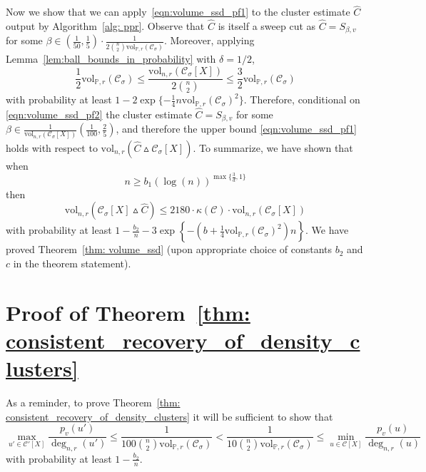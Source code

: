 \documentclass[11pt,twoside]{article}
\newcommand{\set}[1]{\left\{#1\right\}}
\newcommand{\vol}{\mathrm{vol}}
\newcommand{\1}{\mathbbm{1}}
\newcommand{\Xbf}{X}
\newcommand{\Pbb}{\mathbb{P}}
\newcommand{\Cset}{\mathcal{C}}
\newcommand{\Csig}{\Cset_{\sigma}}
\newcommand{\Cest}{\widehat{C}}
\begin{document}
Now we show that we can apply~\eqref{eqn:volume_ssd_pf1} to the cluster estimate $\Cest$ output by Algorithm~\ref{alg: ppr}. Observe that $\Cest$ is itself a sweep cut as $\Cest = S_{\beta,v}$ for some $\beta \in \left(\frac{1}{50},\frac{1}{5}\right)\cdot\frac{1}{2{n \choose 2}\vol_{\Pbb,r}(\Csig)}$. Moreover, applying  Lemma~\ref{lem:ball_bounds_in_probability} with $\delta = 1/2$,
\begin{equation}
\label{eqn:volume_ssd_pf2}
\frac{1}{2}\vol_{\Pbb,r}(\Csig) \leq \frac{\vol_{n,r}(\Csig[\Xbf])}{2{n \choose 2}} \leq \frac{3}{2}\vol_{\Pbb,r}(\Csig)
\end{equation}
with probability at least $1 - 2\exp\{-\frac{1}{4} n \vol_{\Pbb,r}(\Csig)^2\}$. Therefore, conditional on \eqref{eqn:volume_ssd_pf2} the cluster estimate $\Cest = S_{\beta,v}$ for some $\beta \in \frac{1}{\vol_{n,r}(\Csig[\Xbf])}\left(\frac{1}{100},\frac{2}{5}\right)$, and therefore the upper bound \eqref{eqn:volume_ssd_pf1} holds with respect to $\vol_{n,r}(\Cest \vartriangle \Csig[\Xbf])$. To summarize, we have shown that when
\begin{equation*}
n \geq b_1(\log(n))^{\max\{\frac{3}{d},1\}}
\end{equation*}
then
\begin{equation*}
\vol_{n,r}(\Csig[\Xbf] \vartriangle \Cest) \leq  2180 \cdot\kappa(\Cset)\cdot\vol_{n,r}(\Csig[\Xbf])
\end{equation*} 
with probability at least $1 - \frac{b_2}{n} - 3\exp\set{-(b + \frac{1}{4}\vol_{\Pbb,r}(\Csig)^2)n}$. We have proved Theorem~\ref{thm: volume_ssd} (upon appropriate choice of constants $b_2$ and $c$ in the theorem statement).

\section{Proof of Theorem~\ref{thm: consistent_recovery_of_density_clusters}}
\label{sec: proof_of_consistent_cluster_recovery}

As a reminder, to prove Theorem~\ref{thm: consistent_recovery_of_density_clusters} it will be sufficient to show that
\begin{equation}
\label{eqn: PPR_gap}
\max_{u' \in \Cset'[\Xbf]} \frac{p_v(u')}{\deg_{n,r}(u')} \leq \frac{1}{100 {n \choose 2} \vol_{\Pbb,r}(\Csig)} < \frac{1}{10 {n \choose 2} \vol_{\Pbb,r}(\Csig)} \leq \min_{u \in \Cset[\Xbf]} \frac{p_v(u)}{\deg_{n,r}(u)}
\end{equation}
with probability at least $1 - \frac{b_2}{n}$. 
\end{document}
